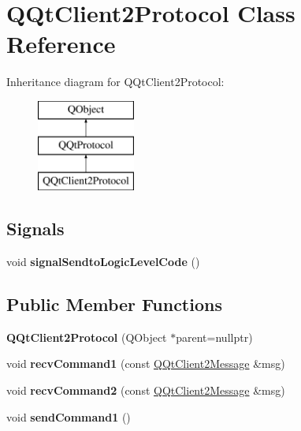 \hypertarget{class_q_qt_client2_protocol}{}\section{Q\+Qt\+Client2\+Protocol Class Reference}
\label{class_q_qt_client2_protocol}
Inheritance diagram for Q\+Qt\+Client2\+Protocol\+:\begin{figure}[H]
\begin{center}
\leavevmode
\includegraphics[height=3.000000cm]{class_q_qt_client2_protocol}
\end{center}
\end{figure}
\subsection*{Signals}
\begin{DoxyCompactItemize}
\item 
\mbox{\label{class_q_qt_client2_protocol_aff971ada789852194668dd2f8d807b87}} 
void {\bfseries signal\+Sendto\+Logic\+Level\+Code} ()
\end{DoxyCompactItemize}
\subsection*{Public Member Functions}
\begin{DoxyCompactItemize}
\item 
\mbox{\label{class_q_qt_client2_protocol_a07ac2b0ce53e37a5963d145c77457775}} 
{\bfseries Q\+Qt\+Client2\+Protocol} (Q\+Object $\ast$parent=nullptr)
\item 
\mbox{\label{class_q_qt_client2_protocol_a4eee40d85c7e12bf92d106d5aaa29324}} 
void {\bfseries recv\+Command1} (const \mbox{\hyperlink{class_q_qt_client2_message}{Q\+Qt\+Client2\+Message}} \&msg)
\item 
\mbox{\label{class_q_qt_client2_protocol_a00f36e689afba4c720189329d318dbdb}} 
void {\bfseries recv\+Command2} (const \mbox{\hyperlink{class_q_qt_client2_message}{Q\+Qt\+Client2\+Message}} \&msg)
\item 
\mbox{\label{class_q_qt_client2_protocol_a66448ced6e5669ad6dd245e623dbdcda}} 
void {\bfseries send\+Command1} ()
\end{DoxyCompactItemize}
